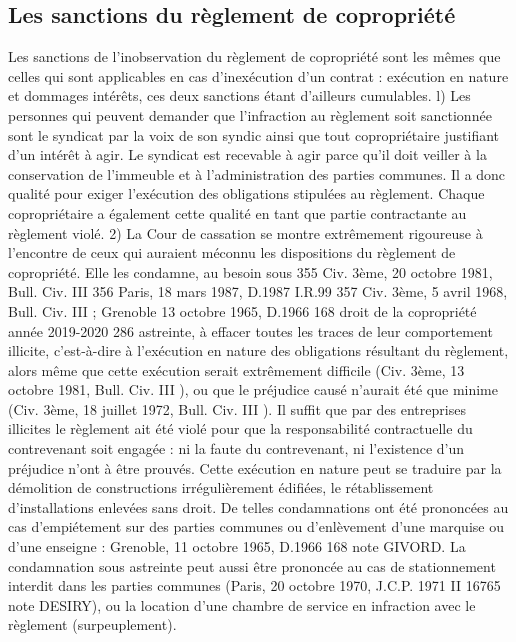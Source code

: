 	\subsection{Les sanctions du règlement de copropriété}
	
		Les sanctions de l'inobservation du règlement de copropriété sont les mêmes que celles qui sont applicables en cas d'inexécution d'un contrat : exécution en nature et dommages intérêts, ces deux sanctions étant d'ailleurs cumulables.
		l) Les personnes qui peuvent demander que l'infraction au règlement soit sanctionnée sont le syndicat par la voix de son syndic ainsi que tout copropriétaire justifiant d'un intérêt à agir.
		Le syndicat est recevable à agir parce qu’il doit veiller à la conservation de l'immeuble et à l'administration des parties communes. Il a donc qualité pour exiger l'exécution des obligations stipulées au règlement.
		Chaque copropriétaire a également cette qualité en tant que partie contractante au règlement violé.
		2) La Cour de cassation se montre extrêmement rigoureuse à l'encontre de ceux qui auraient méconnu les dispositions du règlement de copropriété. Elle les condamne, au besoin sous
		355 Civ. 3ème, 20 octobre 1981, Bull. Civ. III 
		356 Paris, 18 mars 1987, D.1987 I.R.99
		357 Civ. 3ème, 5 avril 1968, Bull. Civ. III ; Grenoble 13 octobre 1965, D.1966 168
		droit de la copropriété année 2019-2020
		286
		astreinte, à effacer toutes les traces de leur comportement illicite, c'est-à-dire à l'exécution en nature des obligations résultant du règlement, alors même que cette exécution serait extrêmement difficile (Civ. 3ème, 13 octobre 1981, Bull. Civ. III ), ou que le préjudice causé n'aurait été que minime (Civ. 3ème, 18 juillet 1972, Bull. Civ. III ). Il suffit que par des entreprises illicites le règlement ait été violé pour que la responsabilité contractuelle du contrevenant soit engagée : ni la faute du contrevenant, ni l'existence d'un préjudice n'ont à être prouvés.
		Cette exécution en nature peut se traduire par la démolition de constructions irrégulièrement édifiées, le rétablissement d'installations enlevées sans droit. De telles condamnations ont été prononcées au cas d'empiétement sur des parties communes ou d'enlèvement d'une marquise ou d'une enseigne : Grenoble, 11 octobre 1965, D.1966 168 note GIVORD. La condamnation sous astreinte peut aussi être prononcée au cas de stationnement interdit dans les parties communes (Paris, 20 octobre 1970, J.C.P. 1971 II 16765 note DESIRY), ou la location d'une chambre de service en infraction avec le règlement (surpeuplement).
